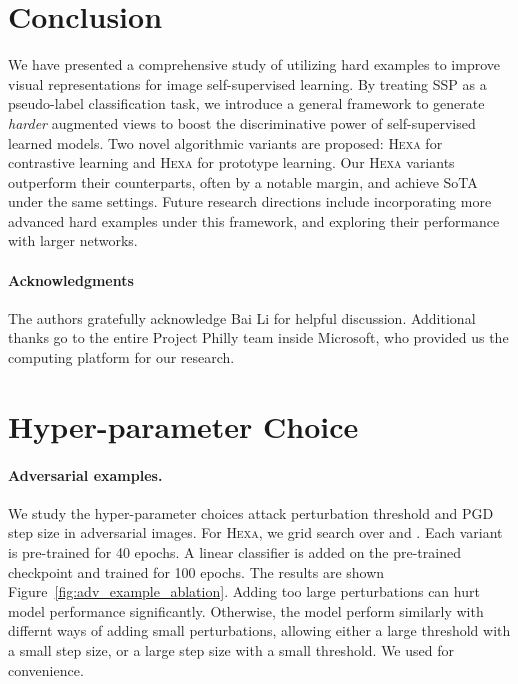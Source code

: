 \documentclass[10pt,twocolumn,letterpaper]{article}
\newcommand{\shortname}{\textsc{Hexa}}
\begin{document}
\section{Conclusion}
We have presented a comprehensive study of utilizing hard examples to improve visual representations for image self-supervised learning. By treating SSP as a pseudo-label classification task, we introduce a general framework to generate {\em harder} augmented views to boost the discriminative power of self-supervised learned models. Two novel algorithmic variants are proposed: \shortname{} for contrastive learning and \shortname{} for prototype learning. Our \shortname{} variants outperform their counterparts, often by a notable margin, and achieve SoTA under the same settings. Future research directions include incorporating more advanced hard examples under this framework, and exploring their performance with larger networks. 



\newpage

\paragraph{Acknowledgments}  The authors gratefully acknowledge Bai Li for
helpful discussion. Additional thanks go to the entire Project Philly team inside Microsoft, who provided us the computing platform for our research.

{\small


}



\appendix
\newpage









\section{Hyper-parameter Choice}

\paragraph{Adversarial examples.}
We study the hyper-parameter choices attack perturbation threshold  and PGD step size   in adversarial images. For \shortname{}, we grid search over  and . Each variant is pre-trained for 40 epochs. A linear classifier is added on the  pre-trained checkpoint and trained for 100 epochs. The results are shown Figure~\ref{fig:adv_example_ablation}. Adding too large perturbations   can hurt model performance significantly. Otherwise, the model perform similarly with differnt ways of adding small perturbations, allowing either a large threshold with a small step size, or a large step size with a small threshold. We used  for convenience.
\end{document}

